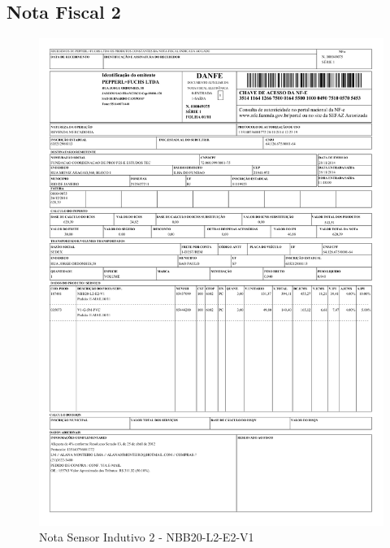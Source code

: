  \subsection{Nota Fiscal 2}
\begin{figure}[H]
 \centering
 \includegraphics[width=0.9\columnwidth]{Indutivo/nota_indutivo2.pdf}
 \caption{Nota Sensor Indutivo 2 - NBB20-L2-E2-V1}
 \end{figure}